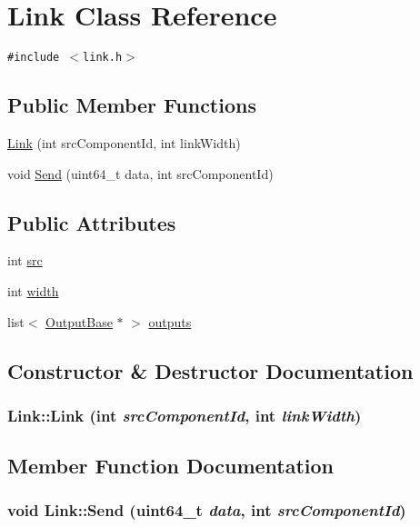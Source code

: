 \hypertarget{classLink}{
\section{Link Class Reference}
\label{classLink}
}
{\tt \#include $<$link.h$>$}

\subsection*{Public Member Functions}
\begin{CompactItemize}
\item 
\hyperlink{classLink_16c40a3222f347d6b3fc2698fc5b9038}{Link} (int srcComponentId, int linkWidth)
\item 
void \hyperlink{classLink_9739f28f141d67a3ab14ddd6e4edc985}{Send} (uint64\_\-t data, int srcComponentId)
\end{CompactItemize}
\subsection*{Public Attributes}
\begin{CompactItemize}
\item 
int \hyperlink{classLink_87fb6a54e52fc0c8cea06eafefc8b555}{src}
\item 
int \hyperlink{classLink_6b5ee52bc53fe5063a5805a8f1a5694f}{width}
\item 
list$<$ \hyperlink{classOutputBase}{OutputBase} $\ast$ $>$ \hyperlink{classLink_ffbc0480926b9f0e59c7581a5ccc1cee}{outputs}
\end{CompactItemize}


\subsection{Constructor \& Destructor Documentation}
\hypertarget{classLink_16c40a3222f347d6b3fc2698fc5b9038}{
\subsubsection[{Link}]{\setlength{\rightskip}{0pt plus 5cm}Link::Link (int {\em srcComponentId}, \/  int {\em linkWidth})}}
\label{classLink_16c40a3222f347d6b3fc2698fc5b9038}




\subsection{Member Function Documentation}
\hypertarget{classLink_9739f28f141d67a3ab14ddd6e4edc985}{
\subsubsection[{Send}]{\setlength{\rightskip}{0pt plus 5cm}void Link::Send (uint64\_\-t {\em data}, \/  int {\em srcComponentId})}}
\label{classLink_9739f28f141d67a3ab14ddd6e4edc985}




